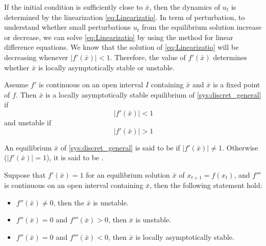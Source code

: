 If the initial condition is sufficiently close to $\bar x$, then the dynamics of $u_t$ is determined by the linearization \eqref{eq:Linearizatio}. In term of perturbation, to understand whether small perturbations $u_t$ from the equilibrium solution increase or decrease, we can solve \eqref{eq:Linearizatio} by using the method for linear difference equations. We know that the solution of \eqref{eq:Linearizatio} will be decreasing whenever $|f'(\bar x)|<1$. Therefore, the value of $f'(\bar x)$ determines whether $\bar x$ is locally asymptotically stable or unstable.



\begin{theorem}
Assume  $f'$ is continuous on an open interval $I$ containing $\bar x$ and $\bar x$ is a fixed point of $f$. Then $\bar x$ is a locally asymptotically stable equilibrium of \eqref{sys:discret_general} if
$$|f'(\bar x)|<1$$
and unstable if $$|f'(\bar x)|>1$$
\end{theorem}




\begin{definition}
An equilibrium $\bar x$ of \eqref{sys:discret_general} is said to be  if $|f'(\bar x)|\not =1$.
Otherwise ($|f'(\bar x)| =1$), it is said to be  .
\end{definition}

\begin{theorem}
Suppose that $f'(\bar x) =1$ for an equilibrium solution $\bar x$ of $x_{t+1}=f(x_t)$, and $f'''$ is continuous on an open interval containing $\bar x$, then the following statement hold:
\begin{itemize}
\item $f''(\bar x)\not =0$, then the $\bar x$ is unstable.
\item $f''(\bar x)=0$ and $f'''(\bar x)>0$, then $\bar x$ is unstable.
\item $f''(\bar x)=0$ and $f'''(\bar x)<0$, then $\bar x$ is locally asymptotically stable.
\end{itemize}
\end{theorem}

